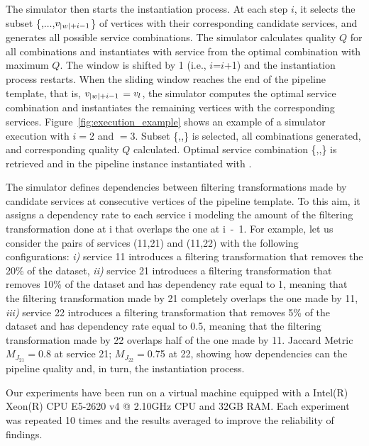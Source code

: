 The simulator then starts the instantiation process. At each step $i$, it selects the subset \{,$\ldots$,$v_{|w|+i-1}$\} of vertices with their corresponding candidate services, and generates all possible service combinations. The simulator calculates quality $Q$ for all combinations and instantiates  with service  from the optimal combination with maximum $Q$. The window is shifted by 1 (i.e., $i$=$i$+1) and the instantiation process restarts. When the sliding window reaches the end of the pipeline template, that is, $v_{|w|+i-1}$$=$$v_{l}$, the simulator computes the optimal service combination and instantiates the remaining vertices with the corresponding services.
Figure~\ref{fig:execution_example} shows an example of a simulator execution with $i$$=$2 and \windowsize$=$3. Subset \{,,\} is selected, all combinations generated, and corresponding quality $Q$ calculated. Optimal service combination \{,,\} is retrieved and  in the pipeline instance instantiated with .

The simulator defines dependencies between filtering transformations made by candidate services at consecutive vertices of the pipeline template. To this aim, it assigns a dependency rate to each service \si{i} modeling the amount of the filtering transformation done at \si{i} that overlaps the one at \si{i-1}. 
For example, let us consider the pairs of services (\si{11},\si{21}) and (\si{11},\si{22}) with the following configurations: \emph{i)} service \si{11} introduces a filtering transformation that removes the 20\% of the dataset, \emph{ii)} service \si{21} introduces a filtering transformation that removes 10\% of the dataset and has dependency rate equal to 1, meaning that the filtering transformation made by \si{21} completely overlaps the one made by \si{11}, \emph{iii)} service \si{22} introduces a filtering transformation that removes 5\% of the dataset and has dependency rate equal to 0.5, meaning that the filtering transformation made by \si{22} overlaps half of the one made by \si{11}. Jaccard Metric $M_{J_{21}}$$=$0.8 at service \si{21}; $M_{J_{22}}$$=$0.75 at \si{22}, showing how dependencies can the pipeline quality and, in turn, the instantiation process.


Our experiments have been run on a virtual machine equipped with a Intel(R) Xeon(R) CPU E5-2620 v4 @ 2.10GHz CPU and 32GB RAM.
Each experiment was repeated 10 times and the results averaged to improve the reliability of findings.

